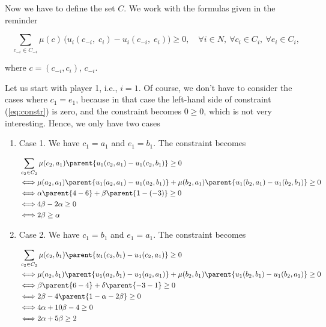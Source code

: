 Now we have to define the set $C$. We work with the formulas given in the reminder

\begin{equation}
\label{eq:constr}
	\sum_{c_{-i} \in C_{-i}} \mu(c) \, \big( u_i(c_{-i}, \; c_i) - u_i(c_{-i}, \; e_i) \big) \geq 0, \quad \forall i \in N, \ \forall c_i \in C_i, \ \forall e_i \in C_i,
\end{equation}

where $c = (c_{-i}, c_i)$, $c_{-i}$.

Let us start with player 1, i.e., $i=1$. Of course, we don't have to consider the cases where $c_1 = e_1$, because in that case the left-hand side of constraint (\ref{eq:constr}) is zero, and the constraint becomes $0 \geq 0$, which is not very interesting. Hence, we only have two cases
\begin{enumerate}
    \item Case 1. We have $c_1 = a_1$ and $e_1 = b_1$. The constraint becomes

    \begin{align*}
    & \sum_{c_{2} \in C_{2}} \mu(c_2,a_1) \parent{ u_1(c_{2}, a_1) - u_1(c_{2}, b_1) } \geq 0 \\
    & \Longleftrightarrow
    \mu(a_2,a_1) \parent{ u_1(a_{2}, a_1) - u_1(a_{2}, b_1) }
    +
    \mu(b_2,a_1) \parent{ u_1(b_{2}, a_1) - u_1(b_{2}, b_1) }
    \geq 0 \\
    & \Longleftrightarrow
    \alpha \parent{ 4 - 6 }
    +
    \beta \parent{ 1 - (-3) }
    \geq 0 \\
    & \Longleftrightarrow
    4 \beta - 2 \alpha
    \geq 0 \\
    & \Longleftrightarrow
    2 \beta \geq \alpha  \\
    \end{align*}

    \item Case 2. We have $c_1 = b_1$ and $e_1 = a_1$. The constraint becomes

    \begin{align*}
    & \sum_{c_{2} \in C_{2}} \mu(c_2,b_1) \parent{ u_1(c_{2}, b_1) - u_1(c_{2}, a_1) } \geq 0 \\
    & \Longleftrightarrow
    \mu(a_2,b_1) \parent{ u_1(a_{2}, b_1) - u_1(a_{2}, a_1) }
    +
    \mu(b_2,b_1) \parent{ u_1(b_{2}, b_1) - u_1(b_{2}, a_1) }
    \geq 0 \\
    & \Longleftrightarrow
    \beta \parent{ 6 - 4 }
    +
    \delta \parent{ - 3 - 1 }
    \geq 0 \\
    & \Longleftrightarrow
    2 \beta
    -
    4 \parent{ 1 - \alpha - 2 \beta}
    \geq 0 \\
    & \Longleftrightarrow
    4 \alpha + 10 \beta - 4
    \geq 0 \\
    & \Longleftrightarrow
    2 \alpha + 5 \beta \geq 2 \\
    \end{align*}

\end{enumerate}

